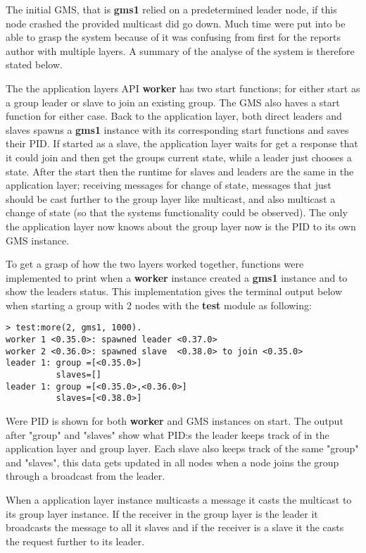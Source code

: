 \documentclass[a4paper, 11pt]{article}
\begin{document}
The initial GMS, that is \textbf{gms1} relied on a predetermined leader node, if this node crashed the provided multicast did go down. Much time were put into be able to grasp the system because of it was confusing from first for the reports author with multiple layers. A summary of the analyse of the system is therefore stated below.

The the application layers API \textbf{worker} has two start functions; for either start as a group leader or slave to join an existing group. The GMS also haves a start function for either case. Back to the application layer, both direct leaders and slaves spawns a \textbf{gms1} instance with its corresponding start functions and saves their PID. If started as a slave, the application layer waits for get a response that it could join and then get the groups current state, while a leader just chooses a state. After the start then the runtime for slaves and leaders are the same in the application layer; receiving messages for change of state, messages that just should be cast further to the group layer like multicast, and also multicast a change of state (so that the systems functionality could be observed). The only the application layer now knows about the group layer now is the PID to its own GMS instance.

To get a grasp of how the two layers worked together, functions were implemented to print when a \textbf{worker} instance created a \textbf{gms1} instance and to show the leaders status. This implementation gives the terminal output below when starting a group with 2 nodes with the \textbf{test} module as following:

\begin{verbatim}
> test:more(2, gms1, 1000).
worker 1 <0.35.0>: spawned leader <0.37.0>
worker 2 <0.36.0>: spawned slave  <0.38.0> to join <0.35.0>
leader 1: group =[<0.35.0>]
          slaves=[]
leader 1: group =[<0.35.0>,<0.36.0>]
          slaves=[<0.38.0>]
\end{verbatim}

Were PID is shown for both \textbf{worker} and GMS instances on start. The output after "group" and "slaves" show what PID:s the leader keeps track of in the application layer and group layer. Each slave also keeps track of the same "group" and "slaves", this data gets updated in all nodes when a node joins the group through a broadcast from the leader.

When a application layer instance multicasts a message it casts the multicast to its group layer instance. If the receiver in the group layer is the leader it broadcasts the message to all it slaves and if the receiver is a slave it the casts the request further to its leader.
\end{document}
